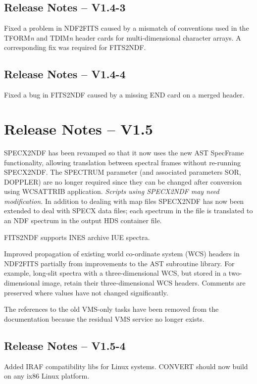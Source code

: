 \documentclass[twoside,11pt]{article}
\newcommand{\htmlref}[2]{#1}
\newcommand{\xref}[3]{#1}
\begin{document}
\subsection{Release Notes -- V1.4-3}
Fixed a problem in \htmlref{NDF2FITS}{NDF2FITS} caused by a mismatch of
conventions used in the TFORM\textit{n} and TDIM\textit{n} header cards for
multi-dimensional character arrays.  A corresponding fix was required for
\htmlref{FITS2NDF}{FITS2NDF}.

\subsection{Release Notes -- V1.4-4}
Fixed a bug in \htmlref{FITS2NDF}{FITS2NDF} caused by a missing END card on a
merged header.
  
\section{Release Notes -- V1.5}

\htmlref{SPECX2NDF}{SPECX2NDF} has been revamped so that it now uses
the new AST \xref{SpecFrame functionality}{sun95}{se_wcsuse},
allowing translation between spectral frames without re-running
SPECX2NDF.  The SPECTRUM parameter (and associated parameters SOR,
DOPPLER) are no longer required since they can be changed after
conversion using \xref{WCSATTRIB}{sun95}{WCSATTRIB} application. {\em
Scripts using SPECX2NDF may need modification.} In addition to dealing
with map files SPECX2NDF has now been extended to deal with
\xref{SPECX}{sun17}{data_formats_in_and_data_migration_to_the_unix_version}
data files; each spectrum in the file is translated to an NDF spectrum
in the output HDS container file.

\htmlref{FITS2NDF}{FITS2NDF} supports INES archive IUE spectra.

Improved propagation of existing world co-ordinate system (WCS)
headers in \htmlref{NDF2FITS}{NDF2FITS} partially from improvements to
the \xref{AST subroutine library}{sun210}{}.  For example, long-slit
spectra with a three-dimensional WCS, but stored in a two-dimensional
image, retain their three-dimensional WCS headers.  Comments are
preserved where values have not changed significantly.

The references to the old VMS-only tasks have been removed from the
documentation because the residual VMS service no longer exists.

\subsection{Release Notes -- V1.5-4}
Added IRAF compatibility libs for Linux systems.  CONVERT should now
build on any ix86 Linux platform. 
\end{document}
